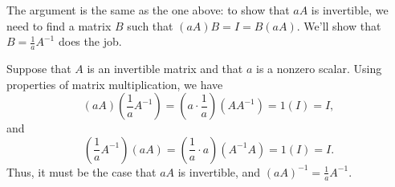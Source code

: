 \documentclass[12pt]{article}
\begin{document}
\begin{enumerate}
\medskip

The argument is the same as the one above: to show that $aA$ is invertible, we need to find a matrix $B$ such that $(aA)B = I = B(aA)$. We'll show that $B = \frac{1}{a}A^{-1}$ does the job.

\medskip

Suppose that $A$ is an invertible matrix and that $a$ is a nonzero scalar. Using properties of matrix multiplication, we have
\[
 (aA)\left(\frac{1}{a}A^{-1}\right) = \left(a\cdot \frac{1}{a}\right)(AA^{-1}) = 1(I)=I,
\]
and
\[
 \left(\frac{1}{a}A^{-1}\right)(aA) = \left(\frac{1}{a}\cdot a\right)(A^{-1}A) = 1(I)=I.
\]
Thus, it must be the case that $aA$ is invertible, and $(aA)^{-1} = \frac{1}{a}A^{-1}$.

 \end{enumerate}
\end{document}
